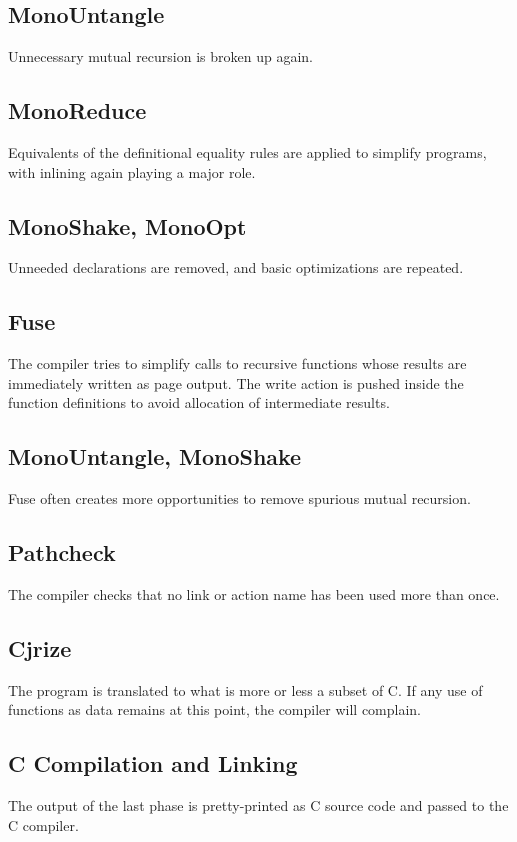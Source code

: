 \documentclass{article}
\begin{document}
\subsection{MonoUntangle}

Unnecessary mutual recursion is broken up again.

\subsection{MonoReduce}

Equivalents of the definitional equality rules are applied to simplify programs, with inlining again playing a major role.

\subsection{MonoShake, MonoOpt}

Unneeded declarations are removed, and basic optimizations are repeated.

\subsection{Fuse}

The compiler tries to simplify calls to recursive functions whose results are immediately written as page output.  The write action is pushed inside the function definitions to avoid allocation of intermediate results.

\subsection{MonoUntangle, MonoShake}

Fuse often creates more opportunities to remove spurious mutual recursion.

\subsection{Pathcheck}

The compiler checks that no link or action name has been used more than once.

\subsection{Cjrize}

The program is translated to what is more or less a subset of C.  If any use of functions as data remains at this point, the compiler will complain.

\subsection{C Compilation and Linking}

The output of the last phase is pretty-printed as C source code and passed to the C compiler.
\end{document}
